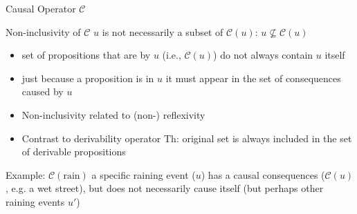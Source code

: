 \documentclass{beamer} %
\begin{document}
\begin{frame}[allowframebreaks]{Causal Operator $\mathcal{C}$ }
    \begin{block}{Non-inclusivity of $\mathcal{C}$}
        $u$ is not necessarily a subset of $\mathcal{C}(u)$: $u \nsubseteq \mathcal{C}(u)$
    \end{block}
    \begin{itemize}
        \item set of propositions that are  by $u$ (i.e., $\mathcal{C}(u)$) do not always contain $u$ itself
        \item just because a proposition is in $u$ it must  appear in the set of consequences caused by $u$
        \item Non-inclusivity related to (non-) reflexivity
        \item Contrast to derivability operator $\text{Th}$: original set is always included in the set of derivable propositions
    \end{itemize}
    \begin{exampleblock}{Example: $\mathcal{C}(\text{rain})$}
        a specific raining event ($u$) has a causal consequences ($\mathcal{C}(u)$, e.g. a wet street), but does not necessarily cause itself (but perhaps other raining events $u'$)
    \end{exampleblock}
    
\framebreak


\end{frame}
\end{document}
